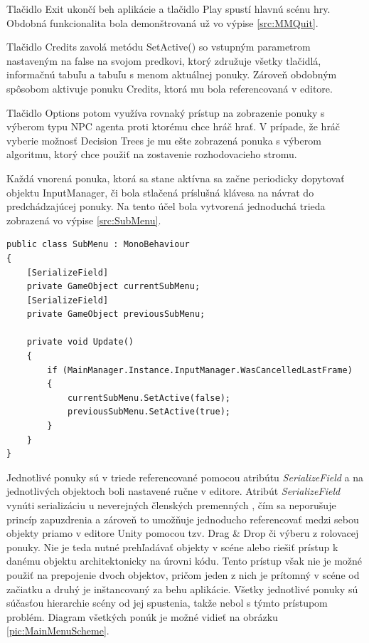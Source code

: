 \documentclass[slovak, master]{diploma}
\begin{document}
Tlačidlo Exit ukončí beh aplikácie a tlačidlo Play spustí hlavnú scénu hry. Obdobná funkcionalita bola demonštrovaná už vo výpise \ref{src:MMQuit}.

Tlačidlo Credits zavolá metódu SetActive() so vstupným parametrom nastaveným na false na svojom predkovi, ktorý združuje všetky tlačidlá, informačnú tabuľu a tabuľu s menom aktuálnej ponuky. Zároveň obdobným spôsobom aktivuje ponuku Credits, ktorá mu bola referencovaná v editore. 

Tlačidlo Options potom využíva rovnaký prístup na zobrazenie ponuky s výberom typu NPC agenta proti ktorému chce hráč hrať. V prípade, že hráč vyberie možnosť Decision Trees je mu ešte zobrazená ponuka s výberom algoritmu, ktorý chce použiť na zostavenie rozhodovacieho stromu.

Každá vnorená ponuka, ktorá sa stane aktívna sa začne periodicky dopytovať objektu InputManager, či bola stlačená príslušná klávesa na návrat do predchádzajúcej ponuky. Na tento účel bola vytvorená jednoduchá trieda zobrazená vo výpise \ref{src:SubMenu}.

\vspace{8pt}
\begin{lstlisting}[label=src:SubMenu,caption={Trieda SubMenu}]
public class SubMenu : MonoBehaviour
{
    [SerializeField]
    private GameObject currentSubMenu;
    [SerializeField]
    private GameObject previousSubMenu;

    private void Update()
    {
        if (MainManager.Instance.InputManager.WasCancelledLastFrame)
        {
            currentSubMenu.SetActive(false);
            previousSubMenu.SetActive(true);
        }
    }
}
\end{lstlisting}

Jednotlivé ponuky sú v triede referencované pomocou atribútu \textit{SerializeField} a na jednotlivých objektoch boli nastavené ručne v editore. Atribút \textit{SerializeField} vynúti serializáciu u neverejných členských premenných \cite{SerializeField}, čím sa neporušuje princíp zapuzdrenia a zároveň to umožňuje jednoducho referencovať medzi sebou objekty priamo v editore Unity pomocou tzv. Drag \& Drop či výberu z rolovacej ponuky. Nie je teda nutné prehľadávať objekty v scéne alebo riešiť prístup k danému objektu architektonicky na úrovni kódu. Tento prístup však nie je možné použiť na prepojenie dvoch objektov, pričom jeden z nich je prítomný v scéne od začiatku a druhý je inštancovaný za behu aplikácie. Všetky jednotlivé ponuky sú súčasťou hierarchie scény od jej spustenia, takže nebol s týmto prístupom problém. Diagram všetkých ponúk je možné vidieť na obrázku \ref{pic:MainMenuScheme}.
\end{document}
